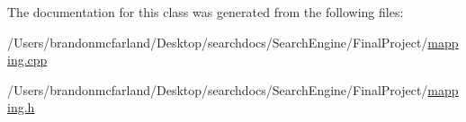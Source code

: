 The documentation for this class was generated from the following files\+:\begin{DoxyCompactItemize}
\item 
/\+Users/brandonmcfarland/\+Desktop/searchdocs/\+Search\+Engine/\+Final\+Project/\hyperlink{mapping_8cpp}{mapping.\+cpp}\item 
/\+Users/brandonmcfarland/\+Desktop/searchdocs/\+Search\+Engine/\+Final\+Project/\hyperlink{mapping_8h}{mapping.\+h}\end{DoxyCompactItemize}
